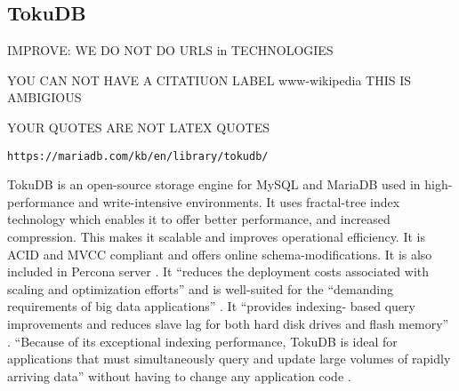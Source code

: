 \subsection{TokuDB}

IMPROVE: WE DO NOT DO URLS in TECHNOLOGIES

YOU CAN NOT HAVE A CITATIUON LABEL www-wikipedia THIS IS AMBIGIOUS

YOUR QUOTES ARE NOT LATEX QUOTES

\verb|https://mariadb.com/kb/en/library/tokudb/|
 
TokuDB is an open-source storage engine for MySQL and MariaDB used in high-
performance and write-intensive environments. It uses fractal-tree index 
technology which enables it to offer better performance, and increased compression. 
This makes it scalable and improves operational efficiency. It is ACID and MVCC 
compliant and offers online schema-modifications. It is also included in Percona 
server \cite{www-wikipedia}. It “reduces the deployment costs associated with 
scaling and optimization efforts” and is well-suited for the “demanding 
requirements of big data applications” \cite{www-percona}. It “provides indexing-
based query improvements and reduces slave lag for both hard disk drives and flash 
memory” \cite{www-wikipedia}. “Because of its exceptional indexing performance, 
TokuDB is ideal for applications that must simultaneously query and update large 
volumes of rapidly arriving data” without having to change any application code 
\cite{blackbird-si}.

